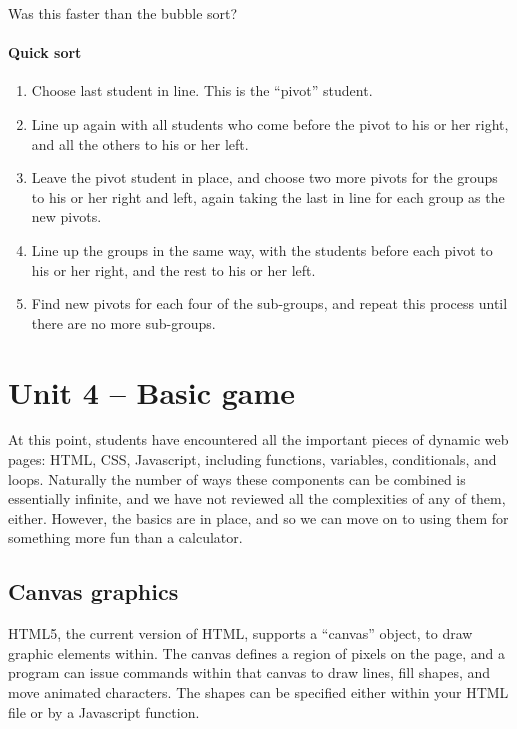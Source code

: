 \documentclass[11pt]{article}
\begin{document}
Was this faster than the bubble sort?

\paragraph{Quick sort}

\begin{enumerate}

\item Choose last student in line.  This is the ``pivot'' student.

\item Line up again with all students who come before the pivot to his
  or her right, and all the others to his or her left.

\item Leave the pivot student in place, and choose two more pivots for
  the groups to his or her right and left, again taking the last in line
  for each group as the new pivots.

\item Line up the groups in the same way, with the students before
  each pivot to his or her right, and the rest to his or her left.

\item Find new pivots for each four of the sub-groups, and repeat this
  process until there are no more sub-groups.

\end{enumerate}


\section{Unit 4 -- Basic game}

At this point, students have encountered all the important pieces of
dynamic web pages: HTML, CSS, Javascript, including functions,
variables, conditionals, and loops.  Naturally the number of ways these
components can be combined is essentially infinite, and we have not
reviewed all the complexities of any of them, either.  However, the
basics are in place, and so we can move on to using them for something
more fun than a calculator.


\subsection{Canvas graphics}
\label{canvas}

HTML5, the current version of HTML, supports a ``canvas'' object, to
draw graphic elements within.  The canvas defines a region of pixels
on the page, and a program can issue commands within that canvas to
draw lines, fill shapes, and move animated characters.  The shapes can
be specified either within your HTML file or by a Javascript function.
\end{document}
